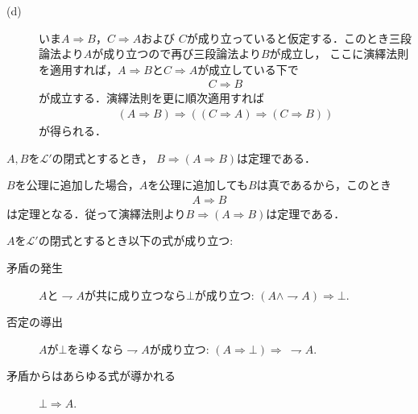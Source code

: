 \begin{prf}
\begin{description}
			\item[(d)]
				いま$A \Longrightarrow B$，$C \Longrightarrow A$および
				$C$が成り立っていると仮定する．このとき三段論法より$A$が成り立つので再び三段論法より$B$が成立し，
				ここに演繹法則を適用すれば，$A \Longrightarrow B$と$C \Longrightarrow A$が成立している下で
				\begin{align}
					C \Longrightarrow B
				\end{align}
				が成立する．演繹法則を更に順次適用すれば
				\begin{align}
					(A \Longrightarrow B) \Longrightarrow ( (C \Longrightarrow A) \Longrightarrow (C \Longrightarrow B) )
				\end{align}
				が得られる．
				\QED
		\end{description}
	\end{prf}
	
	\begin{screen}
		\begin{metathm}\label{metathm:rule_of_inference_2}
			$A,B$を$\mathcal{L}'$の閉式とするとき，
			$B \Longrightarrow (A \Longrightarrow B)$は定理である．
		\end{metathm}
	\end{screen}
	
	\begin{prf}
		$B$を公理に追加した場合，$A$を公理に追加しても$B$は真であるから，このとき
		\begin{align}
			A \Longrightarrow B
		\end{align}
		は定理となる．従って演繹法則より$B \Longrightarrow (A \Longrightarrow B)$は定理である．
		\QED
	\end{prf}
	
	\begin{screen}
		\begin{metaaxm}[矛盾に関する規則]\label{metaaxm:rules_of_contradiction}
			$A$を$\mathcal{L}'$の閉式とするとき以下の式が成り立つ:
			\begin{description}
				\item[矛盾の発生] $A$と$\rightharpoondown A$が共に成り立つなら$\bot$が成り立つ:
					$(A \wedge \rightharpoondown A) \Longrightarrow \bot$.
				\item[否定の導出] $A$が$\bot$を導くなら$\rightharpoondown A$が成り立つ:
					$(A \Longrightarrow \bot) \Longrightarrow\ \rightharpoondown A$.
				\item[矛盾からはあらゆる式が導かれる] $\bot \Longrightarrow A$.
			\end{description}
		\end{metaaxm}
	\end{screen}
	
